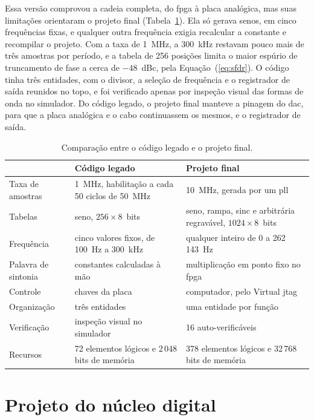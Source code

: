 Essa versão comprovou a cadeia completa, do \ac{fpga} à placa analógica, mas suas limitações orientaram o projeto final (Tabela~\ref{tab:legado}). Ela só gerava senos, em cinco frequências fixas, e qualquer outra frequência exigia recalcular a constante e recompilar o projeto. Com a taxa de 1~MHz, a 300~kHz restavam pouco mais de três amostras por período, e a tabela de 256 posições limita o maior espúrio de truncamento de fase a cerca de \(-48\)~dBc, pela Equação~(\ref{eq:sfdr}). O código tinha três entidades, com o divisor, a seleção de frequência e o registrador de saída reunidos no topo, e foi verificado apenas por inspeção visual das formas de onda no simulador. Do código legado, o projeto final manteve a pinagem do \ac{dac}, para que a placa analógica e o cabo continuassem os mesmos, e o registrador de saída.

\begin{table}
	\caption{Comparação entre o código legado e o projeto final.}
	\label{tab:legado}
	\begin{tabular}{p{} p{} p{}}\toprule
		& Código legado & Projeto final\\\midrule
		Taxa de amostras & 1~MHz, habilitação a cada 50 ciclos de 50~MHz & 10~MHz, gerada por um \ac{pll}\\
		Tabelas & seno, \(256 \times 8\)~bits & seno, rampa, sinc e arbitrária regravável, \(1024 \times 8\)~bits\\
		Frequência & cinco valores fixos, de 100~Hz a 300~kHz & qualquer inteiro de 0 a 262\,143~Hz\\
		Palavra de sintonia & constantes calculadas à mão & multiplicação em ponto fixo no \ac{fpga}\\
		Controle & chaves da placa & computador, pelo Virtual \ac{jtag}\\
		Organização & três entidades & uma entidade por função\\
		Verificação & inspeção visual no simulador & 16 \eng{testbenches} auto-verificáveis\\
		Recursos & 72 elementos lógicos e 2\,048 bits de memória & 378 elementos lógicos e 32\,768 bits de memória\\\bottomrule
	\end{tabular}
\end{table}

\section{Projeto do núcleo digital}

